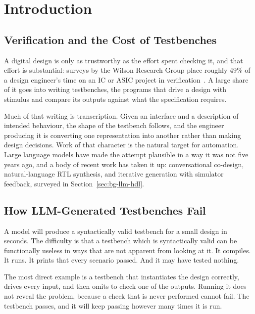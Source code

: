 \documentclass[11pt,a4paper,titlepage=false]{scrreprt}
\begin{document}
\vspace{4mm}
\tableofcontents

\chapter{Introduction}\label{ch:intro}

\section{Verification and the Cost of Testbenches}\label{sec:intro-cost}

A digital design is only as trustworthy as the effort spent checking it, and that effort is
substantial: surveys by the Wilson Research Group place roughly 49\% of a design engineer's
time on an IC or ASIC project in verification~\cite{wilson2022}. A large share of it goes
into writing testbenches, the programs that drive a design with stimulus and compare its
outputs against what the specification requires.

Much of that writing is transcription. Given an interface and a description of intended
behaviour, the shape of the testbench follows, and the engineer producing it is converting
one representation into another rather than making design decisions. Work of that character
is the natural target for automation. Large language models have made the attempt plausible
in a way it was not five years ago, and a body of recent work has taken it up: conversational
co-design, natural-language RTL synthesis, and iterative generation with simulator feedback,
surveyed in Section~\ref{sec:bg-llm-hdl}.

\section{How LLM-Generated Testbenches Fail}\label{sec:intro-failure}

A model will produce a syntactically valid testbench for a small design in seconds. The
difficulty is that a testbench which is syntactically valid can be functionally useless in
ways that are not apparent from looking at it. It compiles. It runs. It prints that every
scenario passed. And it may have tested nothing.

The most direct example is a testbench that instantiates the design correctly, drives every
input, and then omits to check one of the outputs. Running it does not reveal the problem,
because a check that is never performed cannot fail. The testbench passes, and it will keep
passing however many times it is run.
\end{document}
